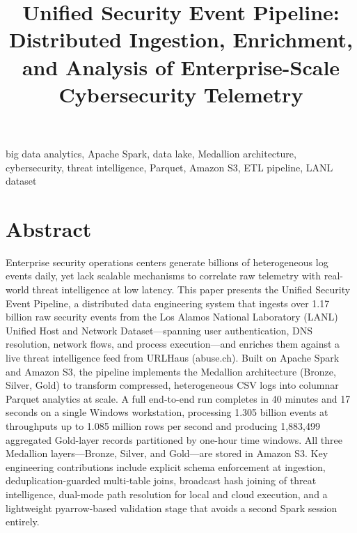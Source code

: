 \documentclass[conference]{IEEEtran}
\begin{document}
\title{Unified Security Event Pipeline: Distributed Ingestion, Enrichment, and Analysis of Enterprise-Scale Cybersecurity Telemetry}

\author{
}

\maketitle

\begin{IEEEkeywords}
big data analytics, Apache Spark, data lake, Medallion architecture, cybersecurity, threat intelligence, Parquet, Amazon S3, ETL pipeline, LANL dataset
\end{IEEEkeywords}

\section{Abstract}

Enterprise security operations centers generate billions of heterogeneous log events daily, yet lack scalable mechanisms to correlate raw telemetry with real-world threat intelligence at low latency. This paper presents the Unified Security Event Pipeline, a distributed data engineering system that ingests over 1.17 billion raw security events from the Los Alamos National Laboratory (LANL) Unified Host and Network Dataset---spanning user authentication, DNS resolution, network flows, and process execution---and enriches them against a live threat intelligence feed from URLHaus (abuse.ch). Built on Apache Spark and Amazon S3, the pipeline implements the Medallion architecture (Bronze, Silver, Gold) to transform compressed, heterogeneous CSV logs into columnar Parquet analytics at scale. A full end-to-end run completes in 40 minutes and 17 seconds on a single Windows workstation, processing 1.305 billion events at throughputs up to 1.085 million rows per second and producing 1,883,499 aggregated Gold-layer records partitioned by one-hour time windows. All three Medallion layers---Bronze, Silver, and Gold---are stored in Amazon S3. Key engineering contributions include explicit schema enforcement at ingestion, deduplication-guarded multi-table joins, broadcast hash joining of threat intelligence, dual-mode path resolution for local and cloud execution, and a lightweight pyarrow-based validation stage that avoids a second Spark session entirely.
\end{document}
